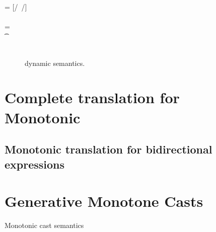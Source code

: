 \documentclass[sigconf]{acmart}
\begin{document}
\begin{figure*}[!h]
\begin{minipage}{0.45\textwidth}
\begin{tabbing}
\> \> \> \> \> \> \> \StrSub {\emptyset} \tp
\\
 \K\HS {\DynCall\a\m\ap}\> \s        \>\Red\>    \K \> \ep \> \s \>  \WHERE\> \ep = {[\a/\this~{\ap/\x}]\e}\HS \\ \> \> \> \> \> \> \> \Mdef\m\x\any\any\e \In \App\K\C \\ \> \> \> \> \> \> \> \App\s\a=\obj{} 
\\
 \K\HS {\MonCast \t\a} \> \s         \>\Red\>   \Kp \> \ap \> \sp \> \WHERE\> \moncast \a\t\s\K \Kp\ap\sp    
\\
\K \HS \EM{\EE[\e]} \> \s            \>\Red\>   \Kp \> \EM{\EE[\ep]} \> \sp \> \WHERE \> \K~\e~\s \Red~\Kp~\ep~\sp
\end{tabbing}
\end{minipage}
\vspace{2mm}

\noindent\hrulefill\caption{\kafka syntax, static and dynamic semantics, and
  monotonic translation.}\label{syn}
\end{figure*}


\begin{figure}[!h]

\medskip
\hrulefill
\caption{\kafka dynamic semantics.}\label{fig:semantics}
\end{figure}

\section{Complete translation for Monotonic}



\subsection{Monotonic translation for bidirectional expressions}


\section{Generative Monotone Casts}

\begin{mathpar}
\end{mathpar}
{Monotonic cast semantics}
\end{document}
